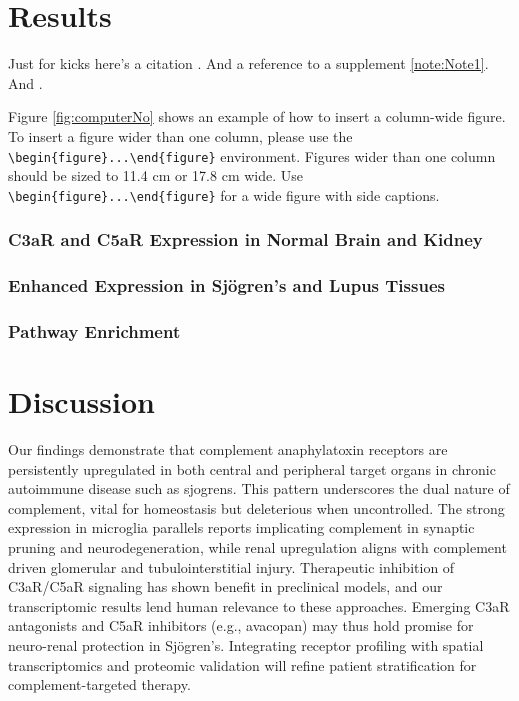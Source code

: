 \documentclass[times, twoside, watermark]{zHenriquesLab-StyleBioRxiv}
\begin{document}
\section*{Results}

Just for kicks here's a citation \cite{carvelli2020}. And a reference to a supplement \cref{note:Note1}. And .



Figure \ref{fig:computerNo} shows an example of how to insert a column-wide figure. To insert a figure wider than one column, please use the \verb|\begin{figure}...\end{figure}| environment. Figures wider than one column should be sized to 11.4 cm or 17.8 cm wide. Use \verb|\begin{figure}...\end{figure}| for a wide figure with side captions.


\subsubsection*{C3aR and C5aR Expression in Normal Brain and Kidney}

\subsubsection*{Enhanced Expression in Sjögren’s and Lupus Tissues}

\subsubsection*{Pathway Enrichment}

\section*{Discussion}
	Our findings demonstrate that complement anaphylatoxin receptors are persistently upregulated in both central and peripheral target organs in chronic autoimmune disease such as sjogrens. This pattern underscores the dual nature of complement, vital for homeostasis but deleterious when uncontrolled.
	The strong expression in microglia parallels reports implicating complement in synaptic pruning and neurodegeneration, while renal upregulation aligns with complement driven glomerular and tubulointerstitial injury. Therapeutic inhibition of C3aR/C5aR signaling has shown benefit in preclinical models, and our transcriptomic results lend human relevance to these approaches.
	Emerging C3aR antagonists and C5aR inhibitors (e.g., avacopan) may thus hold promise for neuro-renal protection in Sjögren’s. Integrating receptor profiling with spatial transcriptomics and proteomic validation will refine patient stratification for complement-targeted therapy.
\end{document}
